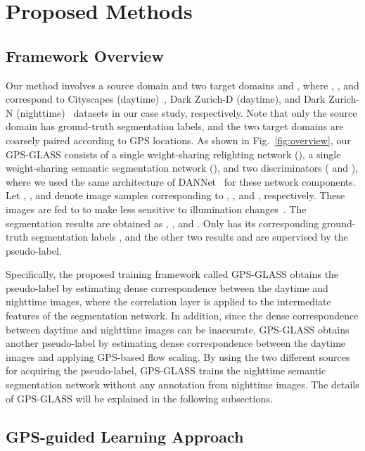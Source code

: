 \documentclass[10pt,twocolumn,letterpaper]{article}
\begin{document}
\section{Proposed Methods}
\subsection{Framework Overview}
Our method involves a source domain  and two target domains  and , where , , and  correspond to Cityscapes (daytime)~\cite{Cordts2016Cityscapes}, Dark Zurich-D (daytime), and Dark Zurich-N (nighttime)~\cite{sakaridis2019guided} datasets in our case study, respectively. Note that only the source domain has ground-truth segmentation labels, and the two target domains are coarsely paired according to GPS locations. As shown in Fig.~\ref{fig:overview}, our GPS-GLASS consists of a single weight-sharing relighting network (), a single weight-sharing semantic segmentation network (), and two discriminators ( and ), where we used the same architecture of DANNet~\cite{wu2021dannet} for these network components. 
Let , , and  denote image samples corresponding to , , and , respectively. These images are fed to  to make  less sensitive to illumination changes~\cite{wu2021dannet}. The segmentation results are obtained as , , and . Only  has its corresponding ground-truth segmentation labels , and the other two results  and  are supervised by the pseudo-label.

Specifically, the proposed training framework called GPS-GLASS obtains the pseudo-label by estimating dense correspondence between the daytime and nighttime images, where the correlation layer is applied to the intermediate features of the segmentation network. In addition, since the dense correspondence between daytime and nighttime images can be inaccurate, GPS-GLASS obtains another pseudo-label by estimating dense correspondence between the daytime images and applying GPS-based flow scaling. By using the two different sources for acquiring the pseudo-label, GPS-GLASS trains the nighttime semantic segmentation network without any annotation from nighttime images. The details of GPS-GLASS will be explained in the following subsections. 

\subsection{GPS-guided Learning Approach}
 
 
\end{document}
